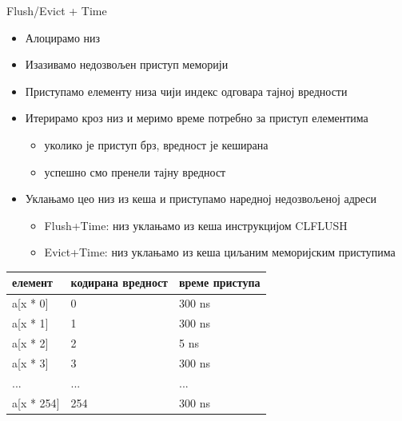 \documentclass[xcolor=table]{beamer}
\begin{document}
    \begin{frame}{Flush/Evict + Time}
        \begin{itemize}
            \item Алоцирамо низ
            \item Изазивамо недозвољен приступ меморији
            \item Приступамо елементу низа чији индекс одговара тајној вредности
            \item Итерирамо кроз низ и меримо време потребно за приступ елементима
            \begin{itemize}
                \item уколико је приступ брз, вредност је кеширана
                \item успешно смо пренели тајну вредност
            \end{itemize}
            \item Уклањамо цео низ из кеша и приступамо наредној недозвољеној адреси
            \begin{itemize}
                \item Flush+Time: низ уклањамо из кеша инструкцијом CLFLUSH
                \item Evict+Time: низ уклањамо из кеша циљаним меморијским приступима
            \end{itemize}
        \end{itemize}
        
        \framebreak
        
        \begin{table}[]
            \begin{tabular}{|l|l|l|}
                \hline
                елемент                             & кодирана вредност        & време приступа                \\ \hline
                \rowcolor[HTML]{FD6864} 
                a{[}x * 0{]}                        & 0                        & 300 ns                        \\ \hline
                \rowcolor[HTML]{FD6864}
                a{[}x * 1{]}                        & 1                        & 300 ns                        \\ \hline
                \rowcolor[HTML]{67FD9A} 
                a{[}x * 2{]}                        & 2                        & 5 ns                          \\ \hline
                \rowcolor[HTML]{FD6864}
                a{[}x * 3{]}                        & 3                        & 300 ns                        \\ \hline
                ...                                 & ...                      & ...                           \\ \hline
                \rowcolor[HTML]{FD6864}
                a{[}x * 254{]}                      & 254                      & 300 ns                        \\ \hline
            \end{tabular}
        \end{table}
        

\end{frame}
\end{document}
